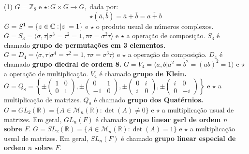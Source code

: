 \documentclass[12pt, a4paper]{article}
\newcommand{\negrito}[1]{\mbox{\boldmath{$#1$}}}
\begin{document}
\begin{tasks}[counter-format={(tsk[a])},label-width=3.6ex, label-format = {\bfseries}, column-sep = {0pt}](1)
\task[\textcolor{Floresta}{$\negrito{(a)} $}] $G = \mathbb{Z}_8$ e $\star \colon G \times G \to G,$ dada por:
\[
\star(\overline{a}, \overline{b}) = \overline{a} + \overline{b} = \overline{a+b}
\]
\task[\textcolor{Floresta}{$\negrito{(b)} $}] $G = S^{1} = \{ z \in \mathbb{C} : \abs{z} = 1 \}$ e $\star$ o produto usual de números complexos.
\task[\textcolor{Floresta}{$\negrito{(c)} $}] $G = S_3 =\langle \sigma, \tau | \sigma^3 = \tau^2 = 1, \tau \sigma = \sigma^2 \tau \rangle$ e $\star$ a operação de composição. $S_3$ é chamado \textbf{grupo de permutações em 3 elementos.}
\task[\textcolor{Floresta}{$\negrito{(d)} $}] $G = D_4 =\langle \sigma, \tau | \sigma^4 = \tau^2 = 1, \tau \sigma = \sigma^3 \tau \rangle$ e $\star$ a operação de composição. $D_4$ é chamado \textbf{grupo diedral de ordem 8.}
\task[\textcolor{Floresta}{$\negrito{(e)} $}] $G = V_4 = \langle a,b | a^2 = b^2 = (ab)^2 = 1 \rangle$ e $\star$ a operação de multiplicação. $V_4$ é chamado \textbf{grupo de Klein.}
\task[\textcolor{Floresta}{$\negrito{(f)} $}] $G = Q_8 = \left\{ \pm \left( \begin{array}{cc} 1 & 0 \\ 0 & 1 \end{array} \right), \pm \left( \begin{array}{cc} 0 & 1 \\ -1 & 0 \end{array}\right), \pm \left( \begin{array}{cc} 0 & i \\ i & 0 \end{array}\right), \pm \left( \begin{array}{cc} i & 0 \\ 0 & -i \end{array}\right) \right\}$ e $\star$ a multiplicação de matrizes. $Q_8$ é chamado \textbf{grupo dos Quatérnios.}
\task[\textcolor{Floresta}{$\negrito{(g)} $}] $G = GL_2(\mathbb{R}) = \{ A \in \mathcal{M}_n(\mathbb{R}) : \det(A) \neq 0 \}$ e $\star$ a multiplicação usual de matrizes. Em geral, $GL_n(F)$ é chamado \textbf{grupo linear gerl de ordem $n$ sobre $F.$}
\task[\textcolor{Floresta}{$\negrito{(h)} $}] $G = SL_2(\mathbb{R}) = \{ A \in \mathcal{M}_n(\mathbb{R}) : \det(A)= 1 \}$ e $\star$ a multiplicação usual de matrizes. Em geral, $SL_n(F)$ é chamado \textbf{grupo linear especial de ordem $n$ sobre $F.$}

\end{tasks}
\end{document}
